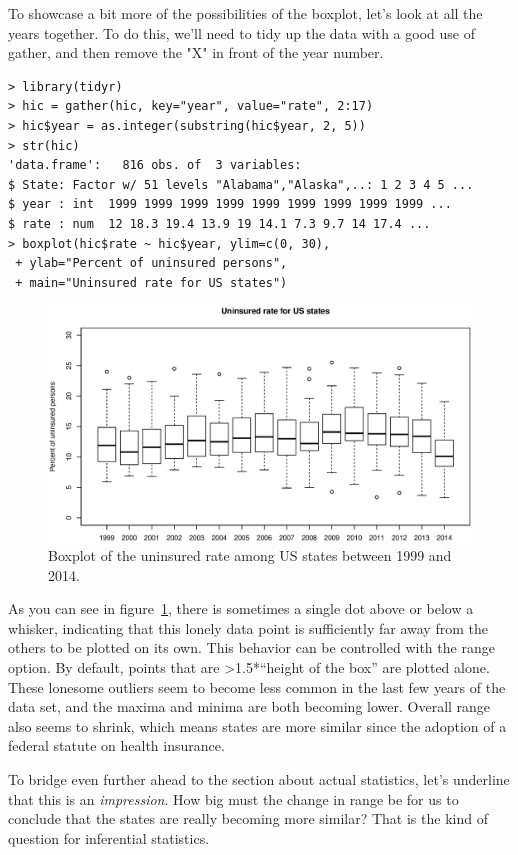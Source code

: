 \documentclass{report}
\newcommand{\code}[1]{\textsf{\ttfamily #1}}
\begin{document}
	To showcase a bit more of the possibilities of the boxplot, let's look at all the years together. To do this, we'll need to tidy up the data with a good use of \code{gather}, and then remove the "X" in front of the year number.
	\begin{verbatim}
> library(tidyr)
> hic = gather(hic, key="year", value="rate", 2:17)
> hic$year = as.integer(substring(hic$year, 2, 5))
> str(hic)
'data.frame':   816 obs. of  3 variables:
$ State: Factor w/ 51 levels "Alabama","Alaska",..: 1 2 3 4 5 ...
$ year : int  1999 1999 1999 1999 1999 1999 1999 1999 1999 ...
$ rate : num  12 18.3 19.4 13.9 19 14.1 7.3 9.7 14 17.4 ...
> boxplot(hic$rate ~ hic$year, ylim=c(0, 30),
 + ylab="Percent of uninsured persons", 
 + main="Uninsured rate for US states")
	\end{verbatim}
	\begin{figure}[h]
		\centering
		\includegraphics[width=1.0\textwidth]{combined_boxplot.eps}
		\caption{Boxplot of the uninsured rate among US states between 1999 and 2014.}
		\label{fig:oboxplot}
	\end{figure}

	As you can see in figure~\ref{fig:oboxplot}, there is sometimes a single dot above or below a whisker, indicating that this lonely data point is sufficiently far away from the others to be plotted on its own. This behavior can be controlled with the \code{range} option. By default, points that are \textgreater1.5*``height of the box'' are plotted alone. These lonesome outliers seem to become less common in the last few years of the data set, and the maxima and minima are both becoming lower. Overall range also seems to shrink, which means states are more similar since the adoption of a federal statute on health insurance.
	
	To bridge even further ahead to the section about actual statistics, let's underline that this is an \emph{impression}. How big must the change in range be for us to conclude that the states are really becoming more similar? That is the kind of question for inferential statistics.
	
\end{document}
